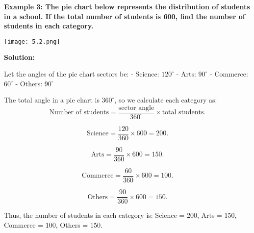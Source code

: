 \begin{flushleft}
	\textbf{Example 3: The pie chart below represents the distribution of students in a school. If the total number of students is 600, find the number of students in each category.}
	
	\vspace{0.5cm}
	
	\begin{center}
		\texttt{[image: 5.2.png]}
	\end{center}
	
	\vspace{0.5cm}
	\textbf{Solution:}
	\vspace{0.5cm}
	
	Let the angles of the pie chart sectors be:
	- Science: $120^\circ$
	- Arts: $90^\circ$
	- Commerce: $60^\circ$
	- Others: $90^\circ$
	
	The total angle in a pie chart is $360^\circ$, so we calculate each category as:
	\[
	\text{Number of students} = \frac{\text{sector angle}}{360^\circ} \times \text{total students}.
	\]
	
	\[
	\text{Science} = \frac{120}{360} \times 600 = 200.
	\]
	
	\[
	\text{Arts} = \frac{90}{360} \times 600 = 150.
	\]
	
	\[
	\text{Commerce} = \frac{60}{360} \times 600 = 100.
	\]
	
	\[
	\text{Others} = \frac{90}{360} \times 600 = 150.
	\]
	
	Thus, the number of students in each category is: Science = 200, Arts = 150, Commerce = 100, Others = 150.
\end{flushleft}

